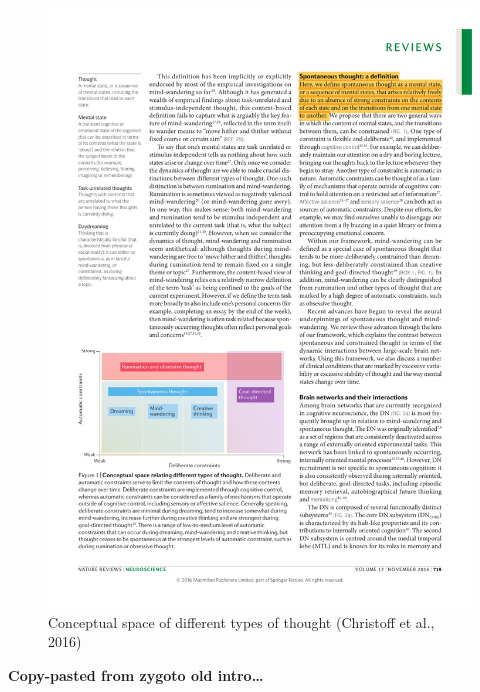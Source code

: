 \documentclass[a4paper,12pt,twoside,openright,oldfontcommands]{memoir}
\begin{document}
\begin{figure}

{\centering \includegraphics[width=0.75\linewidth]{assets/conceptual_space} 

}

\caption{Conceptual space of different types of thought (Christoff et al., 2016)}\label{fig:conceptual}
\end{figure}

\textbf{Copy-pasted from zygoto old intro\ldots{}}
\end{document}
